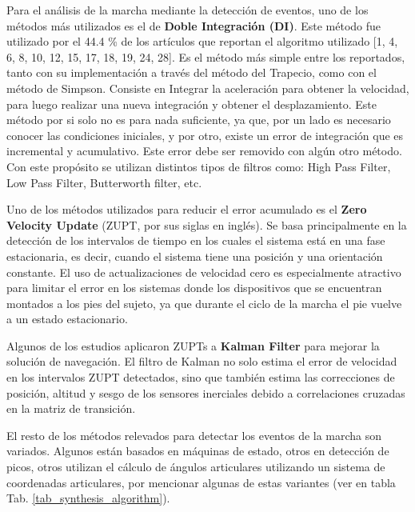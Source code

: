 
Para el análisis de la marcha mediante la detección de eventos, uno de los métodos más utilizados es el de \textbf{Doble Integración (DI)}. Este método fue utilizado por el 44.4 \% de los artículos que reportan el algoritmo utilizado [1, 4, 6, 8, 10, 12, 15, 17, 18, 19, 24, 28]. Es el método más simple entre los reportados, tanto con su implementación a través del método del Trapecio, como con el método de Simpson. Consiste en Integrar la aceleración para obtener la velocidad, para luego realizar una nueva integración y obtener el desplazamiento. Este método por si solo no es para nada suficiente, ya que, por un lado es necesario conocer las condiciones iniciales, y por otro, existe un error de integración que es incremental y acumulativo. Este error debe ser removido con algún otro método. Con este propósito se utilizan distintos tipos de filtros como: High Pass Filter, Low Pass Filter, Butterworth filter, etc. 


Uno de los métodos utilizados para reducir el error acumulado es el \textbf{Zero Velocity Update} (ZUPT, por sus siglas en inglés). Se basa principalmente en la detección de los intervalos de tiempo en los cuales el sistema está en una fase estacionaria, es decir, cuando el sistema tiene una posición y una orientación constante. El uso de actualizaciones de velocidad cero es especialmente atractivo para limitar el error en los sistemas donde los dispositivos que se encuentran montados a los pies del sujeto, ya que durante el ciclo de la marcha el pie vuelve a un estado estacionario.


Algunos de los estudios aplicaron ZUPTs a \textbf{Kalman Filter} para mejorar la solución de navegación. El filtro de Kalman no solo estima el error de velocidad en los intervalos ZUPT detectados, sino que también estima las correcciones de posición, altitud y sesgo de los sensores inerciales debido a correlaciones cruzadas en la matriz de transición.


El resto de los métodos relevados para detectar los eventos de la marcha son variados. Algunos están basados en máquinas de estado, otros en detección de picos, otros utilizan el cálculo de ángulos articulares utilizando un sistema de coordenadas articulares, por mencionar algunas de estas variantes (ver en tabla Tab. \ref{tab_synthesis_algorithm}).

